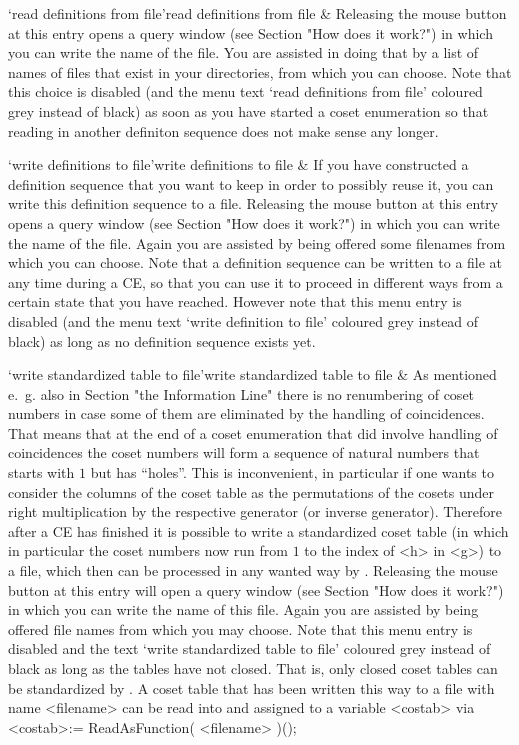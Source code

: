 \beginitems

\>`read definitions from file'{read definitions from file} &
  Releasing the mouse button at this entry opens a query window (see
  Section "How does it work?") in which you can write the name of the
  file. You are assisted in doing that by a list of names of files that
  exist in your directories, from which you can choose. Note that this
  choice is disabled (and the menu text `read definitions from file'
  coloured grey instead of black) as soon as you have started a coset
  enumeration so that reading in another definiton sequence does not
  make sense any longer.


\>`write definitions to file'{write definitions to file} &
  If you have constructed a definition sequence that you want to keep in
  order to possibly reuse it, you can write this definition sequence to
  a file. Releasing the mouse button at this entry opens a query window
  (see Section "How does it work?") in which you can write the name of
  the file. Again you are assisted by being offered some filenames from
  which you can choose. Note that a definition sequence can be written
  to a file at any time during a CE, so that you can use it to proceed
  in different ways from a certain state that you have reached. However
  note that this menu entry is disabled (and the menu text `write
  definition to file' coloured grey instead of black) as long as no
  definition sequence exists yet.


\>`write standardized table to file'{write standardized table to file} &
  As mentioned e.~g. also in Section "the Information Line" there is no
  renumbering of coset numbers in case some of them are eliminated by
  the handling of coincidences. That means that at the end of a coset
  enumeration that did involve handling of coincidences the coset
  numbers will form a sequence of natural numbers that starts with $1$
  but has ``holes''. This is inconvenient, in particular if one wants to
  consider the columns of the coset table as the permutations of the
  cosets under right multiplication by the respective generator (or
  inverse generator). Therefore after a CE has finished it is possible
  to write a standardized coset table (in which in particular the coset
  numbers now run from $1$ to the index of <h> in <g>) to a file, which
  then can be processed in any wanted way by {\GAP}. Releasing the mouse
  button at this entry will open a query window (see Section "How does
  it work?") in which you can write the name of this file. Again you are
  assisted by being offered file names from which you may choose. Note
  that this menu entry is disabled and the text `write standardized
  table to file' coloured grey instead of black as long as the tables
  have not closed. That is, only closed coset tables can be
  standardized by {\ITC}.
  A coset table that has been written this way to a file with name
  <filename> can be read into {\GAP} and assigned to a variable <costab>
  via
\) <costab>:= ReadAsFunction( <filename> )();

